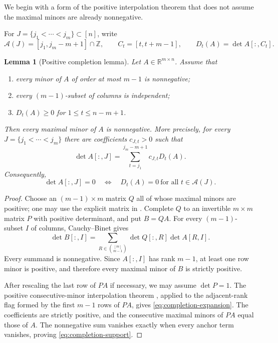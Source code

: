 \documentclass[11pt]{amsart}
\newtheorem{lemma}[theorem]{Lemma}
\theoremstyle{definition}
\theoremstyle{remark}
\newcommand{\R}{\mathbb R}
\newcommand{\Z}{\mathbb Z}
\begin{document}
We begin with a form of the positive interpolation theorem that does not assume the maximal minors are already nonnegative.

For $J=\{j_1<\cdots<j_m\}\subset[n]$, write
\[
 \mathcal A(J)=[j_1,j_m-m+1]\cap\Z,
 \qquad C_t=[t,t+m-1],
 \qquad D_t(A)=\det A[:,C_t].
\]

\begin{lemma}[Positive completion lemma]\label{lem:positive-completion}
Let $A\in\R^{m\times n}$.  Assume that
\begin{enumerate}
\item every minor of $A$ of order at most $m-1$ is nonnegative;
\item every $(m-1)$-subset of columns is independent;
\item $D_t(A)\ge0$ for $1\le t\le n-m+1$.
\end{enumerate}
Then every maximal minor of $A$ is nonnegative.  More precisely, for every $J=\{j_1<\cdots<j_m\}$ there are coefficients $c_{J,t}>0$ such that
\begin{equation}\label{eq:completion-expansion}
 \det A[:,J]=\sum_{t=j_1}^{j_m-m+1}c_{J,t}D_t(A).
\end{equation}
Consequently,
\begin{equation}\label{eq:completion-support}
 \det A[:,J]=0
 \quad\Longleftrightarrow\quad
 D_t(A)=0\ \text{for all }t\in\mathcal A(J).
\end{equation}
\end{lemma}

\begin{proof}
Choose an $(m-1)\times m$ matrix $Q$ all of whose maximal minors are positive; one may use the explicit matrix in \cite[Lemma~7]{CGQpaving}.  Complete $Q$ to an invertible $m\times m$ matrix $P$ with positive determinant, and put $B=QA$.  For every $(m-1)$-subset $I$ of columns, Cauchy--Binet gives
\[
 \det B[:,I]=\sum_{R\in\binom{[m]}{m-1}}
 \det Q[:,R]\det A[R,I].
\]
Every summand is nonnegative.  Since $A[:,I]$ has rank $m-1$, at least one row minor is positive, and therefore every maximal minor of $B$ is strictly positive.

After rescaling the last row of $PA$ if necessary, we may assume $\det P=1$.  The positive consecutive-minor interpolation theorem \cite[Theorem~3]{CGQpaving}, applied to the adjacent-rank flag formed by the first $m-1$ rows of $PA$, gives \eqref{eq:completion-expansion}.  The coefficients are strictly positive, and the consecutive maximal minors of $PA$ equal those of $A$.  The nonnegative sum vanishes exactly when every anchor term vanishes, proving \eqref{eq:completion-support}.
\end{proof}
\end{document}

